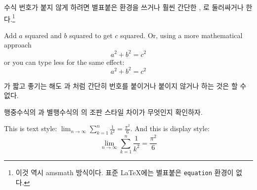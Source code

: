 수식 번호가 붙지 않게 하려면 별표붙은  환경을 쓰거나 훨씬 간단한 \ci{[}, \ci{]}로 둘러싸거나 한다.\footnote{%
  이것 역시 \textsf{amsmath} 방식이다. 표준 \LaTeX 에는 별표붙은 \texttt{equation} 환경이 없다.
}
\begin{example}
Add $a$ squared and $b$ squared
to get $c$ squared. Or, using
a more mathematical approach
 \begin{equation*}
   a^2 + b^2 = c^2
 \end{equation*}
or you can type less for the
same effect:
 \[ a^2 + b^2 = c^2 \]
\end{example}
\ci{[}가 짧고 좋기는 해도 과 처럼 간단히 번호를 붙이거나 붙이지 않거나 하는 것은 할 수 없다.

행중수식의 과 별행수식의 의 조판 스타일 차이가 무엇인지 확인하자.
\begin{example}
This is text style: 
$\lim_{n \to \infty} 
 \sum_{k=1}^n \frac{1}{k^2} 
 = \frac{\pi^2}{6}$.
And this is display style:
 \begin{equation}
  \lim_{n \to \infty} 
  \sum_{k=1}^n \frac{1}{k^2} 
  = \frac{\pi^2}{6}
 \end{equation}
\end{example}

